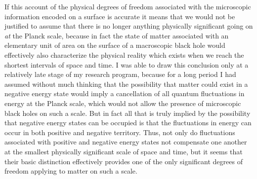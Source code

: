 \documentclass[notitlepage,12pt]{report}
\begin{document}
\noindent If this account of the physical degrees of freedom associated with the microscopic information encoded on a surface is accurate it means that we would not be justified to assume that there is no longer anything physically significant going on \textit{at} the Planck scale, because in fact the state of matter associated with an elementary unit of area on the surface of a macroscopic black hole would effectively also characterize the physical reality which exists when we reach the shortest intervals of space and time. I was able to draw this conclusion only at a relatively late stage of my research program, because for a long period I had assumed without much thinking that the possibility that matter could exist in a negative energy state would imply a cancellation of all quantum fluctuations in energy at the Planck scale, which would not allow the presence of microscopic black holes on such a scale. But in fact all that is truly implied by the possibility that negative energy states can be occupied is that the fluctuations in energy can occur in both positive and negative territory. Thus, not only do fluctuations associated with positive and negative energy states not compensate one another at the smallest physically significant scale of space and time, but it seems that their basic distinction effectively provides one of the only significant degrees of freedom applying to matter on such a scale.
\end{document}
